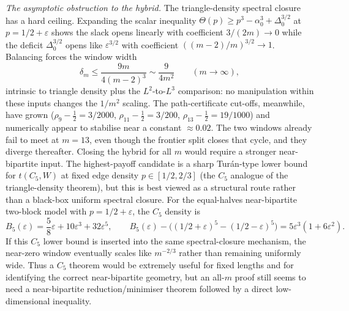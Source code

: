 \documentclass[11pt]{article}
\newcommand{\eps}{\varepsilon}
\begin{document}
\medskip\noindent\emph{The asymptotic obstruction to the hybrid.}
The triangle-density spectral closure has a hard ceiling.  Expanding the scalar inequality $\Theta(p)\ge p^3-\alpha_0^3+\Delta_0^{3/2}$ at $p=1/2+\eps$ shows the slack opens linearly with coefficient $3/(2m)\to0$ while the deficit $\Delta_0^{3/2}$ opens like $\eps^{3/2}$ with coefficient $((m-2)/m)^{3/2}\to1$.  Balancing forces the window width
\[
        \delta_m\le\frac{9m}{4(m-2)^3}\sim\frac{9}{4m^2}
        \qquad(m\to\infty),
\]
intrinsic to triangle density plus the $L^2$-to-$L^3$ comparison: no manipulation within these inputs changes the $1/m^2$ scaling.  The path-certificate cut-offs, meanwhile, have grown ($\rho_9-\tfrac12=3/2000$, $\rho_{11}-\tfrac12=3/200$, $\rho_{13}-\tfrac12=19/1000$) and numerically appear to stabilise near a constant $\approx0.02$.  The two windows already fail to meet at $m=13$, even though the frontier split closes that cycle, and they diverge thereafter.  Closing the hybrid for all $m$ would require a stronger near-bipartite input.  The highest-payoff candidate is a sharp Tur\'an-type lower bound for $t(C_5,W)$ at fixed edge density $p\in[1/2,2/3]$ (the $C_5$ analogue of the triangle-density theorem), but this is best viewed as a structural route rather than a black-box uniform spectral closure.  For the equal-halves near-bipartite two-block model with $p=1/2+\eps$, the $C_5$ density is
\[
        B_5(\eps)=\frac58\eps+10\eps^3+32\eps^5,
        \qquad
        B_5(\eps)-\bigl((1/2+\eps)^5-(1/2-\eps)^5\bigr)
        =5\eps^3(1+6\eps^2).
\]
If this $C_5$ lower bound is inserted into the same spectral-closure mechanism, the near-zero window eventually scales like $m^{-2/3}$ rather than remaining uniformly wide.  Thus a $C_5$ theorem would be extremely useful for fixed lengths and for identifying the correct near-bipartite geometry, but an all-$m$ proof still seems to need a near-bipartite reduction/minimiser theorem followed by a direct low-dimensional inequality.
\end{document}

